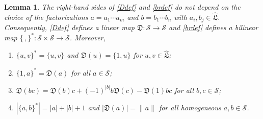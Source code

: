 \documentclass[11pt,reqno]{amsart}
\newcommand{\LL}{\mathfrak L}
\newcommand{\D}{\mathfrak D}
\newcommand{\Sm}{\mathcal S}
\newcommand{\Lh}{\widehat{\LL}}
\newcommand{\rp}[1]{\|#1\|}
\theoremstyle{plain}
\newtheorem{lemma}[theorem]{Lemma}
\theoremstyle{definition}
\theoremstyle{remark}
\begin{document}
\begin{lemma}\label{lem:welldef}
The right-hand sides of \eqref{Ddef} and \eqref{brdef} do not depend on the choice of the factorizations $a=a_1\cdots a_m$ and $b=b_1\cdots b_n$ with $a_i,b_j\in\Lh$.
Consequently, \eqref{Ddef} defines a linear map $\D\colon\Sm\to\Sm$ and \eqref{brdef} defines a bilinear map $\{\,,\}^*\colon\Sm\times\Sm\to\Sm$.
Moreover,
\begin{enumerate}
\item[(i)] $\{u,v\}^*=\{u,v\}$ and $\D(u)=\{1,u\}$ for $u,v\in\Lh$;
\item[(ii)] $\{1,a\}^*=\D(a)$ for all $a\in\Sm$;
\item[(iii)] $\D(bc)=\D(b)c+(-1)^{|b|}b\D(c)-\D(1)bc$ for all $b,c\in\Sm$;
\item[(iv)] $|\{a,b\}^*|=|a|+|b|+1$ and $|\D(a)|=\rp a$ for all homogeneous $a,b\in\Sm$.
\end{enumerate}
\end{lemma}
\end{document}
